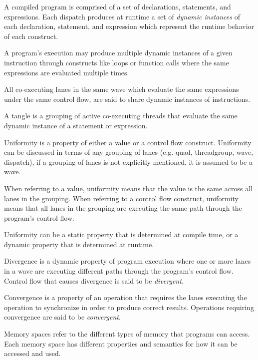 
\p A compiled program is comprised of a set of declarations, statements, and
expressions. Each \gls{dispatch} produces at runtime a set of \textit{dynamic
instances} of each declaration, statement, and expression which represent the
runtime behavior of each construct.

\p A program's execution may produce multiple dynamic instances of a given
instruction through constructs like loops or function calls where the same
expressions are evaluated multiple times.

\p All co-executing \gls{lane}s in the same \gls{wave} which evaluate the same
expressions under the same control flow, are said to share dynamic instances of
instructions.


\p A \gls{tangle} is a grouping of active co-executing threads that evaluate the
same dynamic instance of a statement or expression.


\p Uniformity is a property of either a value or a control flow construct.
Uniformity can be discussed in terms of any grouping of \gls{lane}s (e.g.
\gls{quad}, \gls{threadgroup}, \gls{wave}, \gls{dispatch}), if a grouping of
\gls{lane}s is not explicitly mentioned, it is assumed to be a \gls{wave}.

\p When referring to a value, uniformity means that the value is the same across
all \gls{lane}s in the grouping. When referring to a control flow construct,
uniformity means that all \gls{lane}s in the grouping are executing the same
path through the program's control flow.

\p Uniformity can be a static property that is determined at compile time, or a
dynamic property that is determined at runtime.


\p Divergence is a dynamic property of program execution where one or more
\gls{lane}s in a \gls{wave} are executing different paths through the program's
control flow. Control flow that causes divergence is said to be
\textit{divergent}.


\p Convergence is a property of an operation that requires the \gls{lane}s
executing the operation to synchronize in order to produce correct results.
Operations requiring convergence are said to be \textit{convergent}.


\p Memory spaces refer to the different types of memory that programs can
access. Each memory space has different properties and semantics for how it can
be accessed and used.
